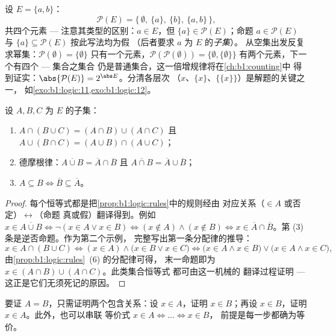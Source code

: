 \begin{example}[熟悉幂集]\label{ex:b1:logic:powerset}
设 $E = \{a, b\}$：
\[
\mathcal P(E) = \bigl\{\, \emptyset,\ \{a\},\ \{b\},\ \{a, b\}
\,\bigr\},
\]
共四个元素 --- 注意其类型的区别：$a \in E$，但
$\{a\} \in \mathcal P(E)$；命题 $a \in \mathcal P(E)$
与 $\{a\} \subseteq \mathcal P(E)$ 按此写法均为假
（后者要求 $a$ 为 $E$ 的\emph{子集}）。
从空集出发反复求幂集：$\mathcal P(\emptyset) = \{\emptyset\}$
只有一个元素，$\mathcal P(\mathcal P(\emptyset)) = \{\emptyset,
\{\emptyset\}\}$ 有两个元素，下一个有四个 --- 集合之集合
仍是普通集合，这一倍增规律将在\cref{ch:b1:counting}中
得到证实：$\abs{\mathcal P(E)} = 2^{\abs E}$。分清各层次
（$x$、$\{x\}$、$\{\{x\}\}$）是解题的关键之一，
如\cref{exo:b1:logic:11,exo:b1:logic:12}。
\end{example}

\begin{proposition}[集合代数]\label{prop:b1:logic:setalgebra}
设 $A, B, C$ 为 $E$ 的子集：
\begin{enumerate}
  \item $A \cap (B \cup C) = (A \cap B) \cup (A \cap C)$ 且
        $A \cup (B \cap C) = (A \cup B) \cap (A \cup C)$；
  \item 德摩根律：$\overline{A \cup B} = \overline{A} \cap
        \overline{B}$ 且 $\overline{A \cap B} = \overline{A} \cup
        \overline{B}$；
  \item $A \subseteq B \iff \overline{B} \subseteq \overline{A}$。
\end{enumerate}
\end{proposition}

\begin{proof}
每个恒等式都是把\cref{prop:b1:logic:rules}中的规则经由
对应关系（$\in A$ 或否定）$\leftrightarrow$（命题
真或假）翻译得到。例如 $x \in \overline{A \cup B} \iff \lnot(x \in A \lor x \in
B) \iff (x \notin A) \land (x \notin B) \iff x \in \overline{A} \cap
\overline{B}$。第 (3) 条是逆否命题。作为第二个示例，
完整写出第一条分配律的推导：
\[
x \in A \cap (B \cup C)
\iff (x \in A) \land \bigl(x \in B \lor x \in C\bigr)
\iff \bigl(x \in A \land x \in B\bigr) \lor
\bigl(x \in A \land x \in C\bigr),
\]
由\cref{prop:b1:logic:rules}~(6) 的分配律可得，
末一命题即为 $x \in (A \cap B) \cup (A \cap C)$。此类集合恒等式
都可由这一机械的
翻译过程证明 --- 这正是它们无须死记的原因。
\end{proof}

\begin{method}[证明集合相等]\label{met:b1:logic:doubleinc}
要证 $A = B$，只需证明两个包含关系：设 $x \in A$，证明 $x \in
B$；再设 $x \in B$，证明 $x \in A$。此外，也可以串联
等价式 $x \in A \iff \dots \iff x \in B$，
前提是每一步都确为等价。
\end{method}

